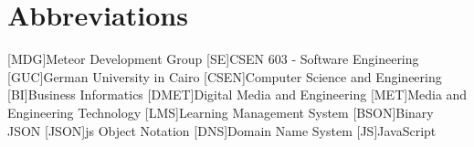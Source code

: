 \appendix
\renewcommand{\appendixtocname}{Appendix}
\renewcommand{\appendixpagename}{\appendixtocname}
\addappheadtotoc
{}
\appendixpage

\chapter{Abbreviations}

\begin{acronym}[\hspace{3cm}]
  [MDG]{Meteor Development Group}
  [SE]{CSEN 603 - Software Engineering}
  [GUC]{German University in Cairo}
  [CSEN]{Computer Science and Engineering}
  [BI]{Business Informatics}
  [DMET]{Digital Media and Engineering}
  [MET]{Media and Engineering Technology \cite{metportal}}
  [LMS]{Learning Management System}
  [BSON]{Binary JSON}
  [JSON]{\ac{js} Object Notation}
  [DNS]{Domain Name System}
  [JS]{JavaScript}
\end{acronym}

\clearpage
\listoffigures
{}
